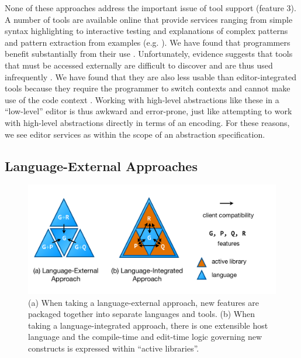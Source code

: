 None of these approaches address the important issue of tool support (feature 3). A number of tools are available online that provide services ranging from simple syntax highlighting to interactive testing and explanations of complex patterns \cite{regexr} and pattern extraction from examples (e.g. \cite{_txt2re:_????}). We have found that programmers benefit substantially from their use \cite{Omar:2012:ACC:2337223.2337324}. Unfortunately, evidence suggests that tools that must be accessed externally are difficult to discover and are thus used infrequently \cite{Murphy-Hill:2011:PIE:1958824.1958888,Campbell:2008:DRT:1636642.1636651,Omar:2012:ACC:2337223.2337324}. We have found that they are also less usable than editor-integrated tools %
because they require the programmer to switch contexts and cannot make use of the code context \cite{Omar:2012:ACC:2337223.2337324}. Working with high-level abstractions like these in a ``low-level'' editor is thus awkward and error-prone, just like attempting to work with high-level abstractions directly in terms of an encoding. For these reasons,   we see editor services as within the scope of an abstraction specification.
\subsection{Language-External Approaches}\label{external-approaches}
\begin{figure}
\begin{center}
\includegraphics[scale=.48]{approaches.pdf}
\end{center}
\vspace{-20px}
\caption{\small (a) When taking a language-external approach, new features are packaged together into separate languages and tools. (b) When taking a language-integrated approach, there is one extensible host language and the compile-time and edit-time logic governing new constructs is expressed within ``active libraries''.}
\label{approaches}
\end{figure}

